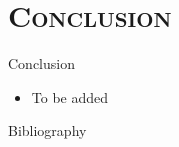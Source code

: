 \documentclass[xcolor=x11names,compress]{beamer}
\renewcommand{\(}{\begin{columns}}
\renewcommand{\)}{\end{columns}}
\newcommand{\<}[1]{\begin{column}{#1}}
\renewcommand{\>}{\end{column}}
\begin{document}
\section{\scshape Conclusion}
\begin{frame}{Conclusion}
\begin{itemize}
\item To be added
\end{itemize}
\end{frame}

\begin{frame}{Bibliography}


\end{frame}
%
\end{document}
